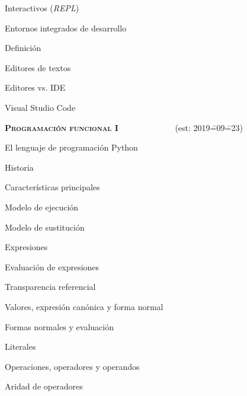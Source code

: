 \begin{longenum}
\begin{longenum}
\begin{longenum}
\begin{longenum}
                \item Interactivos (\textit{REPL})
            \end{longenum}
        \end{longenum}
        \item Entornos integrados de desarrollo
        \begin{longenum}
            \item Definición
            \item Editores de textos
            \item Editores vs. IDE
            \item Visual Studio Code
        \end{longenum}
    \end{longenum}
    \item \textbf{\textsc{Programación funcional I}} \ \ \ \ \ \ \ \ \ \ \ \ \ (est: 2019\==09\==23)
    \begin{longenum}
        \item El lenguaje de programación Python
        \begin{longenum}
            \item Historia
            \item Características principales
        \end{longenum}
        \item Modelo de ejecución
        \begin{longenum}
            \item Modelo de sustitución
        \end{longenum}
        \item Expresiones
        \begin{longenum}
            \item Evaluación de expresiones
            \begin{longenum}
                \item Transparencia referencial
                \item Valores, expresión canónica y forma normal
                \item Formas normales y evaluación
            \end{longenum}
            \item Literales
            \item Operaciones, operadores y operandos
            \begin{longenum}
                \item Aridad de operadores

\end{longenum}
\end{longenum}
\end{longenum}
\end{longenum}
